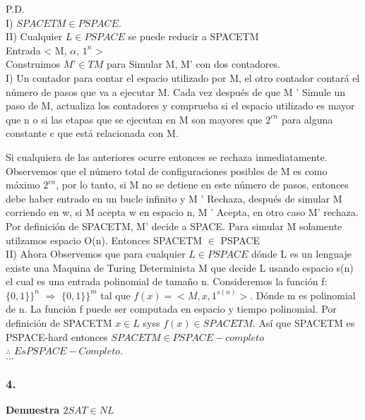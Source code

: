\documentclass[12pt]{article}
\begin{document}
 P.D.\\


I) $SPACETM \in PSPACE.$\\

II) Cualquier $L \in PSPACE$ se puede reducir a SPACETM\\
 
Entrada < M, $\alpha$, $1^{n}$ >\\

Construimos $M’\in TM$ para Simular M, M’ con dos contadores. \\

I) Un contador para contar el espacio utilizado por M, el otro contador contará el número de pasos que va a ejecutar M. Cada vez después de que M ' Simule un paso de M, actualiza los contadores y comprueba si el espacio utilizado 
es mayor que n o si las etapas que se ejecutan en M son mayores que $2^{cn}$  para alguna constante c que está relacionada con M. 

Si cualquiera de las anteriores ocurre entonces se rechaza inmediatamente.  Observemos que el número total de configuraciones posibles de M es como máximo $2^{cn}$, por lo tanto, si M no se detiene en este número de pasos, entonces debe haber entrado en un bucle infinito y M ' Rechaza, después de simular M corriendo en w, si M acepta w en espacio n, M ' Acepta, en otro caso M’ rechaza.
Por definición de SPACETM, M’ decide a SPACE. Para simular M solamente utilzamos espacio O(n). Entonces SPACETM $\in$ PSPACE\\

II) Ahora Observemos que para cualquier $L \in PSPACE$ dónde L es un lenguaje existe una Maquina de Turing Determinista M que decide L usando espacio s(n) el cual es una entrada polinomial de tamaño n.
Consideremos la función f: $\big \{0,1\}\big \}^{n}$ $\Rightarrow$ $\big \{0,1\}\big \}^{m}$ tal que
$f(x)=< M, x, 1^{s(n)}>.$ Dónde m es polinomial de n. La función f puede ser computada en espacio y tiempo polinomial. Por definición de SPACETM $x\in L$ syss $f(x)\in SPACETM.$ Así que SPACETM es PSPACE-hard entonces $SPACETM \in PSPACE-completo$ \\


$\therefore$ $ Es PSPACE-Completo.$\\



$\dots$

\subsubsection*{4.}
\textbf{Demuestra $2SAT \in NL$ } \\
\end{document}

